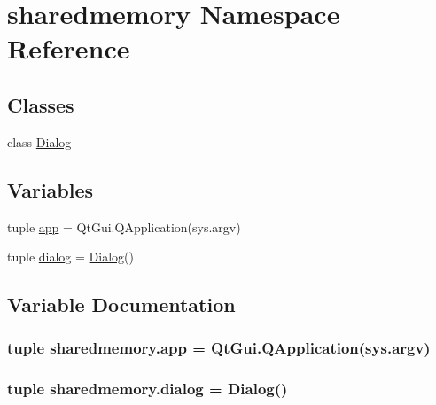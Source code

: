 \hypertarget{namespacesharedmemory}{}\section{sharedmemory Namespace Reference}
\label{namespacesharedmemory}
\subsection*{Classes}
\begin{DoxyCompactItemize}
\item 
class \hyperlink{classsharedmemory_1_1Dialog}{Dialog}
\end{DoxyCompactItemize}
\subsection*{Variables}
\begin{DoxyCompactItemize}
\item 
tuple \hyperlink{namespacesharedmemory_a4f05190fc28e65ec421e3d3853e4fce7}{app} = Qt\+Gui.\+Q\+Application(sys.\+argv)
\item 
tuple \hyperlink{namespacesharedmemory_a5c9328714f2893e134dec390542f7fe9}{dialog} = \hyperlink{classsharedmemory_1_1Dialog}{Dialog}()
\end{DoxyCompactItemize}


\subsection{Variable Documentation}
\hypertarget{namespacesharedmemory_a4f05190fc28e65ec421e3d3853e4fce7}{}
\subsubsection[{app}]{\setlength{\rightskip}{0pt plus 5cm}tuple sharedmemory.\+app = Qt\+Gui.\+Q\+Application(sys.\+argv)}\label{namespacesharedmemory_a4f05190fc28e65ec421e3d3853e4fce7}
\hypertarget{namespacesharedmemory_a5c9328714f2893e134dec390542f7fe9}{}
\subsubsection[{dialog}]{\setlength{\rightskip}{0pt plus 5cm}tuple sharedmemory.\+dialog = {\bf Dialog}()}\label{namespacesharedmemory_a5c9328714f2893e134dec390542f7fe9}
